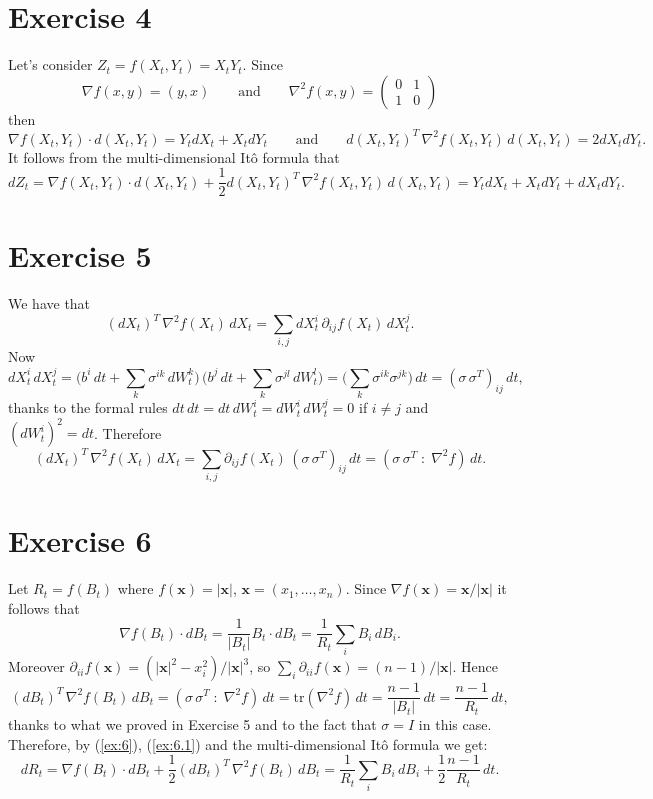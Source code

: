 \documentclass[a4paper,11pt]{article}
\theoremstyle{definition}
\theoremstyle{plain}
\theoremstyle{remark}
\begin{document}
\section*{Exercise 4}

Let's consider $Z_t=f(X_t,Y_t) = X_tY_t$. Since 
$$
\nabla f(x,y) = (y,x) \qquad\text{and}\qquad \nabla^2f(x,y) = \left(\begin{matrix}
0 & 1 \\ 1 & 0
\end{matrix}\right) 
$$
then 
$$
\nabla f(X_t,Y_t) \cdot d(X_t,Y_t) = Y_tdX_t + X_tdY_t \qquad\text{and}\qquad d(X_t,Y_t)^T\,\nabla^2f(X_t,Y_t)\,d(X_t,Y_t) = 2dX_tdY_t. 
$$
It follows from the multi-dimensional It\^o formula that
$$
dZ_t = \nabla f(X_t,Y_t) \cdot d(X_t,Y_t) + \frac{1}{2}d(X_t,Y_t)^T\,\nabla^2f(X_t,Y_t)\,d(X_t,Y_t) = Y_tdX_t + X_tdY_t + dX_tdY_t.
$$

\section*{Exercise 5}

We have that
$$
(dX_t)^T\,\nabla^2f(X_t)\,dX_t = \sum_{i,j}dX_t^i\,\partial_{ij}f(X_t)\,dX_t^j.
$$
Now 
$$
dX_t^i\,dX_t^j = \Big(b^i\,dt + \sum_k\sigma^{ik}\,dW^k_t\Big)\,\Big(b^j\,dt + \sum_k\sigma^{jl}\,dW^l_t\Big) = \Big(\sum_k\sigma^{ik}\sigma^{jk}\Big)\,dt = (\sigma\,\sigma^T)_{ij}\,dt,
$$
thanks to the formal rules $dt\,dt = dt\,dW_t^i = dW_t^i\,dW_t^j = 0$ if $i\neq j$ and $(dW_t^i)^2 = dt$.
Therefore
$$
(dX_t)^T\,\nabla^2f(X_t)\,dX_t = \sum_{i,j} \partial_{ij}f(X_t)\,(\sigma\,\sigma^T)_{ij}\,dt = (\sigma\,\sigma^T\;:\;\nabla^2f)\,dt.
$$

\section*{Exercise 6}

Let $R_t = f(B_t)$ where $f(\mathbf{x})=|\mathbf{x}|$, $\mathbf{x}=(x_1,\dots,x_n)$. Since $\nabla f(\mathbf{x}) = \mathbf{x}/|\mathbf{x}|$ it follows that
\begin{equation}\label{ex:6}
\nabla f(B_t) \cdot dB_t = \frac{1}{|B_t|}B_t\cdot dB_t = \frac{1}{R_t}\sum_iB_i\,dB_i.
\end{equation}
Moreover $\partial_{ii}f(\mathbf{x}) = (|\mathbf{x}|^2-x^2_i)/|\mathbf{x}|^3$, so $\sum_i\partial_{ii}f(\mathbf{x}) = (n-1)/|\mathbf{x}|$. Hence
\begin{equation}\label{ex:6.1}
(dB_t)^T\,\nabla^2 f(B_t)\,dB_t = (\sigma\,\sigma^T\;:\;\nabla^2f)\,dt =\mathrm{tr}(\nabla^2 f)\,dt = \frac{n-1}{|B_t|}\,dt = \frac{n-1}{R_t}\,dt,
\end{equation}
thanks to what we proved in Exercise 5 and to the fact that $\sigma = I$ in this case.
Therefore, by (\ref{ex:6}), (\ref{ex:6.1}) and the multi-dimensional It\^o formula we get:
$$
dR_t = \nabla f(B_t) \cdot dB_t + \frac{1}{2}(dB_t)^T\,\nabla^2 f(B_t)\,dB_t = \frac{1}{R_t}\sum_iB_i\,dB_i + \frac{1}{2}\frac{n-1}{R_t}\,dt.
$$
\end{document}
